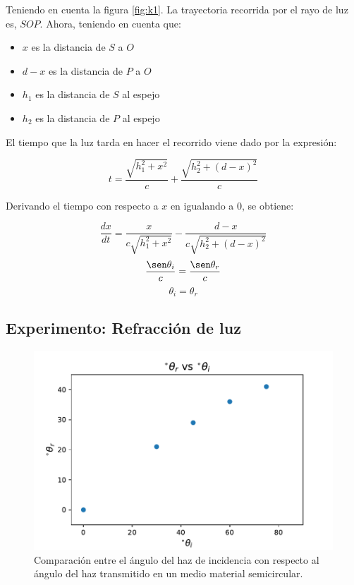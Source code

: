 \documentclass[
aps,
reprint,
amsmath, amssymb,
superscriptaddress,
]{revtex4-2}
\begin{document}
Teniendo en cuenta la figura \ref{fig:k1}. La trayectoria recorrida por el rayo de luz es, $SOP$. Ahora, teniendo en cuenta que:
\begin{itemize}
    \item $x$ es la distancia de $S$ a $O$
    \item $d-x$ es la distancia de $P$ a $O$
    \item $h_1$ es la distancia de $S$ al espejo
    \item $h_2$ es la distancia de $P$ al espejo
\end{itemize}

El tiempo que la luz tarda en hacer el recorrido viene dado por la expresión:

\begin{equation*}
 t = \dfrac{\sqrt{h_1^{2} + x^{2}}}{c} + \dfrac{\sqrt{h_2^{2} + (d - x)^{2}}}{c}   
\end{equation*}

Derivando el tiempo con respecto a $x$ en igualando a $0$, se obtiene:
    
\begin{equation*}
    \dfrac{dx}{dt} = \dfrac{x}{c \sqrt{h_1^{2} + x^{2}}} - \dfrac{d-x}{c\sqrt{h_2^{2} + (d - x)^{2}}}
\end{equation*}
\begin{equation*}
    \dfrac{\sen \theta_{i}}{c} = \frac{\sen \theta_{r}}{c}
\end{equation*}
\begin{equation*}
   \theta_{i}=\theta_{r}
\end{equation*}

\subsection{Experimento: Refracción de luz}
\begin{figure}
\centering
\includegraphics[width=\columnwidth]{img/img2.pdf}
\caption{\label{fig:img_3} Comparación entre el ángulo del haz de incidencia con respecto al ángulo del haz transmitido en un medio material semicircular.}
\end{figure}
\end{document}
